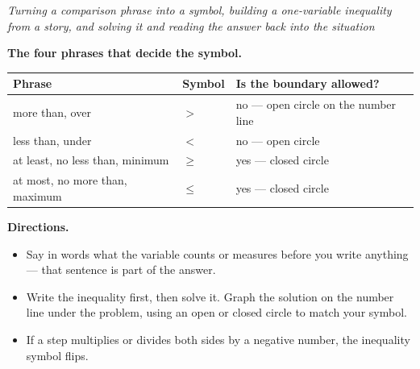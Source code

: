\documentclass[12pt]{article}
\begin{document}

\begin{center}
\textit{Turning a comparison phrase into a symbol, building a one-variable
inequality from a story, and solving it and reading the answer back into the
situation}
\end{center}

\noindent\textbf{The four phrases that decide the symbol.}
\par\vspace{0.15cm}
\begin{center}
\begin{tabular}{@{}llp{6.4cm}@{}}
\toprule
\textbf{Phrase} & \textbf{Symbol} & \textbf{Is the boundary allowed?} \\
\midrule
more than, over & $>$  & no --- open circle on the number line \\
less than, under & $<$ & no --- open circle \\
at least, no less than, minimum & $\ge$ & yes --- closed circle \\
at most, no more than, maximum & $\le$ & yes --- closed circle \\
\bottomrule
\end{tabular}
\end{center}
\vspace{0.15cm}

\noindent\textbf{Directions.}
\begin{itemize}[leftmargin=1.2cm, itemsep=1pt, topsep=2pt]
\item Say in words what the variable counts or measures before you write
anything --- that sentence is part of the answer.
\item Write the inequality first, then solve it. Graph the solution on the
number line under the problem, using an open or closed circle to match your
symbol.
\item If a step multiplies or divides both sides by a negative number, the
inequality symbol flips.
\end{itemize}

\end{document}
